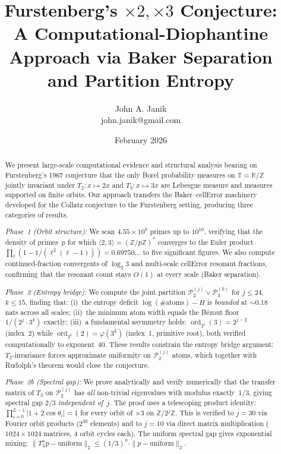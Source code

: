 \documentclass[11pt,a4paper]{article}
\title{Furstenberg's $\times 2, \times 3$ Conjecture:\\
A Computational-Diophantine Approach via Baker Separation\\
and Partition Entropy}
\author{John A. Janik\\
john.janik@gmail.com}
\date{February 2026}
\DeclareMathOperator{\ord}{ord}
\begin{document}
\maketitle

\begin{abstract}
We present large-scale computational evidence and structural analysis
bearing on Furstenberg's 1967 conjecture that the only Borel probability
measures on $\mathbb{T} = \mathbb{R}/\mathbb{Z}$ jointly invariant under
$T_2\colon x \mapsto 2x$ and $T_3\colon x \mapsto 3x$ are Lebesgue
measure and measures supported on finite orbits.
Our approach transfers the Baker--cellError machinery developed for
the Collatz conjecture to the Furstenberg setting, producing three
categories of results.

\emph{Phase~1 (Orbit structure):}
We scan $4.55 \times 10^8$ primes up to $10^{10}$, verifying that the
density of primes~$p$ for which $\langle 2, 3 \rangle = (\mathbb{Z}/p\mathbb{Z})^*$
converges to the Euler product
$\prod_\ell (1 - 1/(\ell^2(\ell-1))) = 0.69750\ldots$
to five significant figures.
We also compute continued-fraction convergents of $\log_2 3$
and multi-scale cellError resonant fractions, confirming that the
resonant count stays $O(1)$ at every scale (Baker separation).

\emph{Phase~2 (Entropy bridge):}
We compute the joint partition $\mathcal{P}_2^{(j)} \vee \mathcal{P}_3^{(k)}$
for $j \leq 24$, $k \leq 15$, finding that:
(i)~the entropy deficit $\log(\text{\#atoms}) - H$ is
\emph{bounded} at $\sim 0.18$ nats across all scales;
(ii)~the minimum atom width equals the B\'ezout floor $1/(2^j \cdot 3^k)$ exactly;
(iii)~a fundamental asymmetry holds: $\ord_{2^j}(3) = 2^{j-2}$ (index~2)
while $\ord_{3^k}(2) = \varphi(3^k)$ (index~1, primitive root), both
verified computationally to exponent~40.
These results constrain the entropy bridge argument: $T_3$-invariance
forces approximate uniformity on $\mathcal{P}_2^{(j)}$ atoms, which
together with Rudolph's theorem would close the conjecture.

\emph{Phase~2b (Spectral gap):}
We prove analytically and verify numerically that the transfer matrix
of $T_3$ on $\mathcal{P}_2^{(j)}$ has \emph{all} non-trivial eigenvalues
with modulus exactly~$1/3$, giving spectral gap $2/3$ \emph{independent of~$j$}.
The proof uses a telescoping product identity:
$\prod_{i=0}^{L-1} |1 + 2\cos\theta_i| = 1$ for every orbit of
$\times 3$ on $\mathbb{Z}/2^j\mathbb{Z}$.
This is verified to $j = 30$ via Fourier orbit products ($2^{30}$ elements)
and to $j = 10$ via direct matrix multiplication ($1024 \times 1024$ matrices,
4 orbit cycles each).
The uniform spectral gap gives exponential mixing:
$\|T_3^n p - \text{uniform}\|_2 \leq (1/3)^n \cdot \|p - \text{uniform}\|_2$.


\end{abstract}
\end{document}
